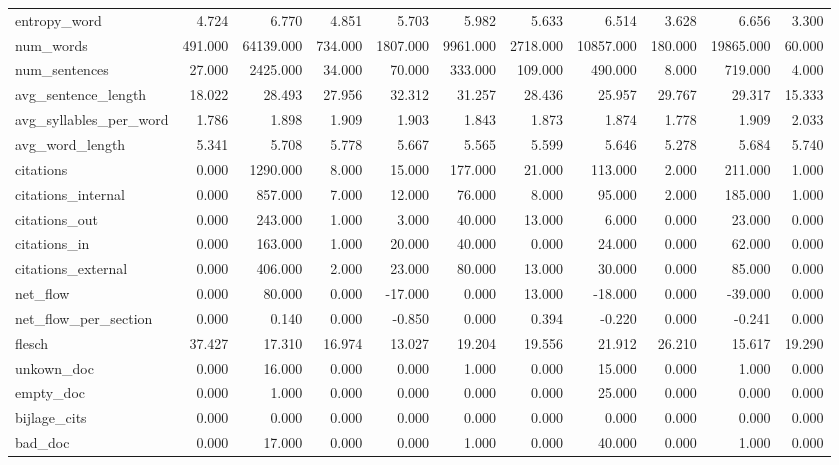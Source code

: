 \begin{tabular}{lrrrrrrrrrr}
\cline{1-11}
entropy\_word & 4.724 & 6.770 & 4.851 & 5.703 & 5.982 & 5.633 & 6.514 & 3.628 & 6.656 & 3.300 \\
\cline{1-11}
num\_words & 491.000 & 64139.000 & 734.000 & 1807.000 & 9961.000 & 2718.000 & 10857.000 & 180.000 & 19865.000 & 60.000 \\
\cline{1-11}
num\_sentences & 27.000 & 2425.000 & 34.000 & 70.000 & 333.000 & 109.000 & 490.000 & 8.000 & 719.000 & 4.000 \\
\cline{1-11}
avg\_sentence\_length & 18.022 & 28.493 & 27.956 & 32.312 & 31.257 & 28.436 & 25.957 & 29.767 & 29.317 & 15.333 \\
\cline{1-11}
avg\_syllables\_per\_word & 1.786 & 1.898 & 1.909 & 1.903 & 1.843 & 1.873 & 1.874 & 1.778 & 1.909 & 2.033 \\
\cline{1-11}
avg\_word\_length & 5.341 & 5.708 & 5.778 & 5.667 & 5.565 & 5.599 & 5.646 & 5.278 & 5.684 & 5.740 \\
\cline{1-11}
citations & 0.000 & 1290.000 & 8.000 & 15.000 & 177.000 & 21.000 & 113.000 & 2.000 & 211.000 & 1.000 \\
\cline{1-11}
citations\_internal & 0.000 & 857.000 & 7.000 & 12.000 & 76.000 & 8.000 & 95.000 & 2.000 & 185.000 & 1.000 \\
\cline{1-11}
citations\_out & 0.000 & 243.000 & 1.000 & 3.000 & 40.000 & 13.000 & 6.000 & 0.000 & 23.000 & 0.000 \\
\cline{1-11}
citations\_in & 0.000 & 163.000 & 1.000 & 20.000 & 40.000 & 0.000 & 24.000 & 0.000 & 62.000 & 0.000 \\
\cline{1-11}
citations\_external & 0.000 & 406.000 & 2.000 & 23.000 & 80.000 & 13.000 & 30.000 & 0.000 & 85.000 & 0.000 \\
\cline{1-11}
net\_flow & 0.000 & 80.000 & 0.000 & -17.000 & 0.000 & 13.000 & -18.000 & 0.000 & -39.000 & 0.000 \\
\cline{1-11}
net\_flow\_per\_section & 0.000 & 0.140 & 0.000 & -0.850 & 0.000 & 0.394 & -0.220 & 0.000 & -0.241 & 0.000 \\
\cline{1-11}
flesch & 37.427 & 17.310 & 16.974 & 13.027 & 19.204 & 19.556 & 21.912 & 26.210 & 15.617 & 19.290 \\
\cline{1-11}
unkown\_doc & 0.000 & 16.000 & 0.000 & 0.000 & 1.000 & 0.000 & 15.000 & 0.000 & 1.000 & 0.000 \\
\cline{1-11}
empty\_doc & 0.000 & 1.000 & 0.000 & 0.000 & 0.000 & 0.000 & 25.000 & 0.000 & 0.000 & 0.000 \\
\cline{1-11}
bijlage\_cits & 0.000 & 0.000 & 0.000 & 0.000 & 0.000 & 0.000 & 0.000 & 0.000 & 0.000 & 0.000 \\
\cline{1-11}
bad\_doc & 0.000 & 17.000 & 0.000 & 0.000 & 1.000 & 0.000 & 40.000 & 0.000 & 1.000 & 0.000 \\
\cline{1-11}
\bottomrule
\end{tabular}
